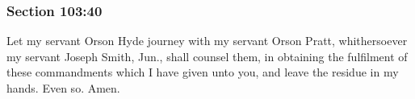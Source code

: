 	\subsubsection{Section 103:40} %
		\label{DC103-40}

		Let my servant Orson Hyde journey with my servant Orson Pratt, whithersoever my servant Joseph Smith, Jun., shall counsel them, in obtaining the fulfilment of these commandments which I have given unto you, and leave the residue in my hands.  Even so.  Amen.

